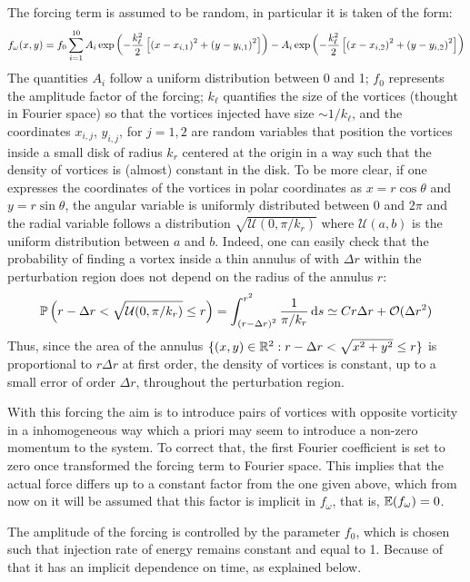 \documentclass[../main.tex]{subfiles}
\begin{document}
The forcing term is assumed to be random, in particular it is taken of the form:
\begin{equation}
	f_\omega(x,y) = f_0\sum_{i=1}^{10} A_i \operatorname{exp}\left(-\frac{k_\ell^2}{2}\left[{(x-x_{i,1})}^2 + {(y-y_{i,1})}^2\right]\right) - A_i\operatorname{exp}\left(-\frac{k_\ell^2}{2}\left[{(x-x_{i,2})}^2 + {(y-y_{i,2})}^2\right]\right)
\end{equation}
The quantities $A_i$ follow a uniform distribution between 0 and 1; $f_0$ represents the amplitude factor of the forcing; $k_\ell$ quantifies the size of the vortices (thought in Fourier space) so that the vortices injected have size $\sim 1/k_\ell$, and the coordinates $x_{i,j}$, $y_{i,j}$, for $j=1,2$ are random variables that position the vortices inside a small disk of radius $k_r$ centered at the origin in a way such that the density of vortices is (almost) constant in the disk. To be more clear, if one expresses the coordinates of the vortices in polar coordinates as $x=r\cos\theta$ and $y=r\sin\theta$, the angular variable is uniformly distributed between 0 and $2\pi$ and the radial variable follows a distribution $\sqrt{\mathcal{U}(0,\pi/k_r)}$ where $\mathcal{U}(a,b)$ is the uniform distribution between $a$ and $b$. Indeed, one can easily check that the probability of finding a vortex inside a thin annulus of with $\Delta r$ within the perturbation region does not depend on the radius of the annulus $r$:
\begin{equation}
	\mathbb{P}\left(r-\Delta r < \sqrt{\mathcal{U}(0,\pi/k_r)} \leq r\right) = \int_{{(r-\Delta r)}^2}^{r^2} \frac{1}{\pi/k_r} \dd{s} \simeq C r \Delta r + \mathcal{O}(\Delta r^2)
\end{equation}
Thus, since the area of the annulus $\{(x,y) \in \mathbb{R}^2 : r-\Delta r < \sqrt{x^2+y^2} \leq r\}$ is proportional to $r \Delta r$ at first order, the density of vortices is constant, up to a small error of order $\Delta r$, throughout the perturbation region.

With this forcing the aim is to introduce pairs of vortices with opposite vorticity in a inhomogeneous way which a priori may seem to introduce a non-zero momentum to the system. To correct that, the first Fourier coefficient is set to zero once transformed the forcing term to Fourier space. This implies that the actual force differs up to a constant factor from the one given above, which from now on it will be assumed that this factor is implicit in $f_\omega$, that is, $\mathbb{E}(f_\omega) = 0$.

The amplitude of the forcing is controlled by the parameter $f_0$, which is chosen such that injection rate of energy remains constant and equal to 1. Because of that it has an implicit dependence on time, as explained below.
\end{document}
